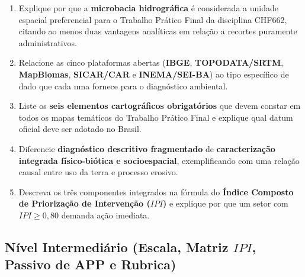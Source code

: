 \begin{enumerate}[leftmargin=1.8em, itemsep=6pt]
  \item Explique por que a \textbf{microbacia hidrográfica} é considerada a unidade espacial preferencial para o Trabalho Prático Final da disciplina CHF662, citando ao menos duas vantagens analíticas em relação a recortes puramente administrativos.
  \espacoResolucao[1.8cm]

  \item Relacione as cinco plataformas abertas (\textbf{IBGE}, \textbf{TOPODATA/SRTM}, \textbf{MapBiomas}, \textbf{SICAR/CAR} e \textbf{INEMA/SEI-BA}) ao tipo específico de dado que cada uma fornece para o diagnóstico ambiental.
  \espacoResolucao[1.8cm]

  \item Liste os \textbf{seis elementos cartográficos obrigatórios} que devem constar em todos os mapas temáticos do Trabalho Prático Final e explique qual datum oficial deve ser adotado no Brasil.
  \espacoResolucao[1.8cm]

  \item Diferencie \textbf{diagnóstico descritivo fragmentado} de \textbf{caracterização integrada físico-biótica e socioespacial}, exemplificando com uma relação causal entre uso da terra e processo erosivo.
  \espacoResolucao[1.8cm]

  \item Descreva os três componentes integrados na fórmula do \textbf{Índice Composto de Priorização de Intervenção ($IPI$)} e explique por que um setor com $IPI \ge 0{,}80$ demanda ação imediata.
  \espacoResolucao[1.8cm]
\end{enumerate}

\subsection*{Nível Intermediário (Escala, Matriz $IPI$, Passivo de APP e Rubrica)}

